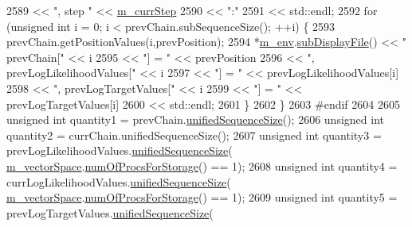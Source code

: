 \begin{DoxyCode}
2589                                 << \textcolor{stringliteral}{", step "}  << \hyperlink{class_q_u_e_s_o_1_1_m_l_sampling_a1b1f8ccb4823bdfa26ec652f0807c63e}{m\_currStep}
2590                                 << \textcolor{stringliteral}{":"}
2591                                 << std::endl;
2592         \textcolor{keywordflow}{for} (\textcolor{keywordtype}{unsigned} \textcolor{keywordtype}{int} i = 0; i < prevChain.subSequenceSize(); ++i) \{
2593           prevChain.getPositionValues(i,prevPosition);
2594           *\hyperlink{class_q_u_e_s_o_1_1_m_l_sampling_a13f1ca4fe9f94822fe572a743eaced1d}{m\_env}.\hyperlink{class_q_u_e_s_o_1_1_base_environment_a8a0064746ae8dddfece4229b9ad374d6}{subDisplayFile}() << \textcolor{stringliteral}{"  prevChain["} << i
2595                                   << \textcolor{stringliteral}{"] = "} << prevPosition
2596                                   << \textcolor{stringliteral}{", prevLogLikelihoodValues["} << i
2597                                   << \textcolor{stringliteral}{"] = "} << prevLogLikelihoodValues[i]
2598                                   << \textcolor{stringliteral}{", prevLogTargetValues["} << i
2599                                   << \textcolor{stringliteral}{"] = "} << prevLogTargetValues[i]
2600                                   << std::endl;
2601         \}
2602       \}
2603 \textcolor{preprocessor}{#endif}
2604 \textcolor{preprocessor}{}
2605       \textcolor{keywordtype}{unsigned} \textcolor{keywordtype}{int} quantity1 = prevChain.\hyperlink{class_q_u_e_s_o_1_1_scalar_sequence_a52829afc95e5c36e9db44f40854153b0}{unifiedSequenceSize}();
2606       \textcolor{keywordtype}{unsigned} \textcolor{keywordtype}{int} quantity2 = currChain.unifiedSequenceSize();
2607       \textcolor{keywordtype}{unsigned} \textcolor{keywordtype}{int} quantity3 = prevLogLikelihoodValues.\hyperlink{class_q_u_e_s_o_1_1_scalar_sequence_a52829afc95e5c36e9db44f40854153b0}{unifiedSequenceSize}(
      \hyperlink{class_q_u_e_s_o_1_1_m_l_sampling_a7bc4c72f65ba9166ed94a6e198b0915b}{m\_vectorSpace}.\hyperlink{class_q_u_e_s_o_1_1_vector_space_a67b0c3620662116f5a346fdaa5faf38e}{numOfProcsForStorage}() == 1);
2608       \textcolor{keywordtype}{unsigned} \textcolor{keywordtype}{int} quantity4 = currLogLikelihoodValues.\hyperlink{class_q_u_e_s_o_1_1_scalar_sequence_a52829afc95e5c36e9db44f40854153b0}{unifiedSequenceSize}(
      \hyperlink{class_q_u_e_s_o_1_1_m_l_sampling_a7bc4c72f65ba9166ed94a6e198b0915b}{m\_vectorSpace}.\hyperlink{class_q_u_e_s_o_1_1_vector_space_a67b0c3620662116f5a346fdaa5faf38e}{numOfProcsForStorage}() == 1);
2609       \textcolor{keywordtype}{unsigned} \textcolor{keywordtype}{int} quantity5 = prevLogTargetValues.\hyperlink{class_q_u_e_s_o_1_1_scalar_sequence_a52829afc95e5c36e9db44f40854153b0}{unifiedSequenceSize}(

\end{DoxyCode}
